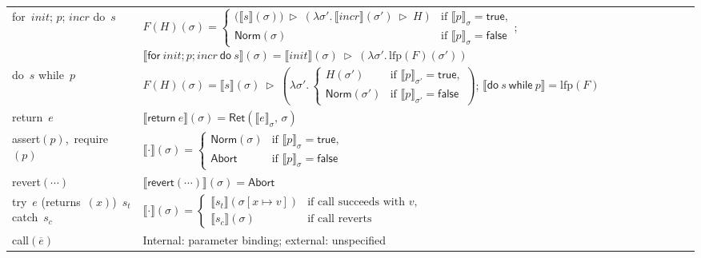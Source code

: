 \documentclass[pdflatex,sn-basic]{sn-jnl}%
\theoremstyle{thmstyleone}%
\theoremstyle{thmstyletwo}%
\theoremstyle{thmstylethree}%
\newcommand{\Abort}{\mathsf{Abort}}
\newcommand{\Norm}{\mathsf{Norm}}
\newcommand{\Ret}{\mathsf{Ret}}
\begin{document}
\begin{table}[t]
\begin{tabularx}{\columnwidth}{@{}l X@{}}
    \textsf{for}\ $init$; $p$; $incr$ \textsf{do}\ $s$ &
    $F(H)(\sigma)=
      \begin{cases}
        \big(\llbracket s\rrbracket(\sigma)\big)\ \triangleright\ (\lambda \sigma'.\,\llbracket incr\rrbracket(\sigma')\ \triangleright\ H) & \text{if }\llbracket p\rrbracket_\sigma=\mathsf{true},\\
        \Norm(\sigma) & \text{if }\llbracket p\rrbracket_\sigma=\mathsf{false}
      \end{cases}$;
    $\llbracket \textsf{for}\ init; p; incr\ \textsf{do}\ s\rrbracket(\sigma)=\llbracket init\rrbracket(\sigma)\ \triangleright\ (\lambda \sigma'.\,\mathrm{lfp}(F)(\sigma'))$\\

    \textsf{do}\ $s$ \textsf{while}\ $p$ &
    $F(H)(\sigma)=\llbracket s\rrbracket(\sigma)\ \triangleright\ (\lambda \sigma'.\,
      \begin{cases}
        H(\sigma') & \text{if }\llbracket p\rrbracket_{\sigma'}=\mathsf{true},\\
        \Norm(\sigma') & \text{if }\llbracket p\rrbracket_{\sigma'}=\mathsf{false}
      \end{cases})$;
    $\llbracket \textsf{do}\ s\ \textsf{while}\ p\rrbracket=\mathrm{lfp}(F)$\\

    \textsf{return}\ $e$ &
    $\llbracket \textsf{return}\ e\rrbracket(\sigma)=\Ret(\llbracket e\rrbracket_\sigma,\,\sigma)$\\

    \textsf{assert}$(p)$,\ \textsf{require}$(p)$ &
    $\llbracket \cdot\rrbracket(\sigma)=
      \begin{cases}
        \Norm(\sigma) & \text{if }\llbracket p\rrbracket_\sigma=\mathsf{true},\\
        \Abort & \text{if }\llbracket p\rrbracket_\sigma=\mathsf{false}
      \end{cases}$\\

    \textsf{revert}$(\cdots)$ &
    $\llbracket \textsf{revert}(\cdots)\rrbracket(\sigma)=\Abort$\\

    \textsf{try}\ $e$ (\textsf{returns}\ $(x)$)\ $s_t$ \textsf{catch}\ $s_c$ &
    $\llbracket \cdot\rrbracket(\sigma)=
      \begin{cases}
        \llbracket s_t\rrbracket(\sigma[x\mapsto v]) & \text{if call succeeds with }v,\\
        \llbracket s_c\rrbracket(\sigma) & \text{if call reverts}
      \end{cases}$\\

    \textsf{call}$(\overline{e})$ &
    Internal: parameter binding; external: unspecified\\
    \bottomrule
  \end{tabularx}
\end{table}
\end{document}

